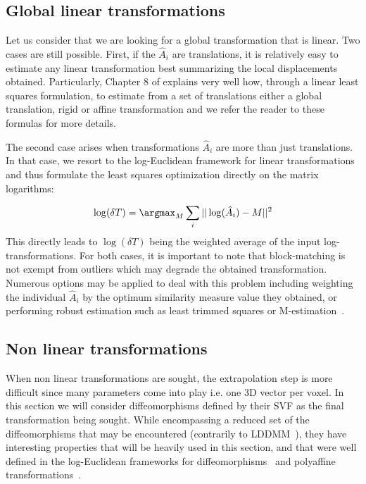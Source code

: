 \subsection{Global linear transformations}

Let us consider that we are looking for a global transformation that is linear. Two cases are still possible. First, if the $\hat{A}_i$ are translations, it is relatively easy to estimate any linear transformation best summarizing the local displacements obtained. Particularly, Chapter 8 of \cite{Pennec_PhD_1996} explains very well how, through a linear least squares formulation, to estimate from a set of translations either a global translation, rigid or affine transformation and we refer the reader to these formulas for more details.

The second case arises when transformations $\hat{A}_i$ are more than just translations. In that case, we resort to the log-Euclidean framework for linear transformations~\cite{arsigny:inria-00616084} and thus formulate the least squares optimization directly on the matrix logarithms:

\begin{equation}
	\log(\delta T) = \argmax_{M} \sum_i || \log(\hat{A}_i) - M ||^2
\end{equation}
This directly leads to $\log(\delta T)$ being the weighted average of the input log-transformations. For both cases, it is important to note that block-matching is not exempt from outliers which may degrade the obtained transformation. Numerous options may be applied to deal with this problem including weighting the individual $\hat{A}_i$ by the optimum similarity measure value they obtained, or performing robust estimation such as least trimmed squares or M-estimation~\cite{Rousseeuw_Book_1987}.

\subsection{Non linear transformations}
\label{sub:non-linear-extrapolation}

When non linear transformations are sought, the extrapolation step is more difficult since many parameters come into play i.e. one 3D vector per voxel. In this section we will consider diffeomorphisms defined by their \ac{SVF} as the final transformation being sought. While encompassing a reduced set of the diffeomorphisms that may be encountered (contrarily to \ac{LDDMM}~\cite{Beg_IJCV_2005}), they have interesting properties that will be heavily used in this section, and that were well defined in the log-Euclidean frameworks for diffeomorphisms~\cite{arsigny:inria-00615594} and polyaffine transformations~\cite{arsigny:inria-00616084}.

